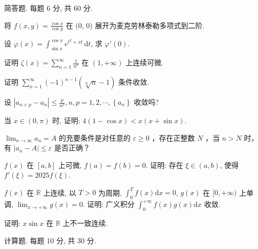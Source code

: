 \par{}
简答题. 每题 6 分, 共 60 分.\par
将 $f(x, y) = \frac{\cos x}{\cos y}$ 在 (0, 0) 展开为麦克劳林泰勒多项式到二阶.\par
设 $\varphi(x) = \int_{\sin x}^{\cos x} e^{t^2 + xt} \, \mathrm{d}t$, 求 $\varphi'(0)$.\par
证明 $\zeta(x) = \sum_{n=1}^{\infty} \frac{1}{n^x}$ 在 $(1, +\infty)$ 上连续可微.\par
证明 $\sum_{n=1}^{\infty} (-1)^{n-1} (\sqrt[n]{n} - 1)$ 条件收敛.\par
设  $\left|a_{n+p}-a_{n}\right|\leq\frac{p}{n^{2}}, n,p=1,2,\cdots,\left\{a_{n}\right\}$  收敛吗?\par
当 $x \in (0, \pi)$ 时, 证明: $4(1 - \cos x) < x(x + \sin x)$.\par
$\lim_{n\to \infty}a_n = A$ 的充要条件是对任意的 $\varepsilon \geq 0$ ，存在正整数 $N$ ，当 $n > N$ 时，有 $|a_{n} - A|\leq \varepsilon$ 是否正确？\par
$f(x)$ 在 $[a, b]$ 上可微, $f(a) = f(b) = 0$. 证明: 存在 $\xi \in (a, b)$, 使得 $f'(\xi) = 2025f(\xi)$.\par
$f(x)$ 在 $\mathbb{R}$ 上连续, 以 $T > 0$ 为周期, $\int_0^T f(x)\mathrm{d}x = 0$, $g(x)$ 在 $[0, +\infty)$ 上单调, $\lim_{x\to +\infty}g(x) = 0$. 证明: 广义积分 $\int_0^{+\infty}f(x)g(x)\mathrm{d}x$ 收敛.\par
证明: $x \sin x$ 在 $\mathbb{R}$ 上不一致连续.\par
\par{}
计算题. 每题 10 分, 共 30 分.\par
